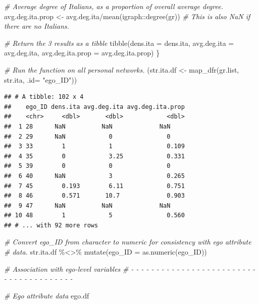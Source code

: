 \documentclass[
]{book}
\newenvironment{Shaded}{\begin{snugshade}}{\end{snugshade}}
\newcommand{\AttributeTok}[1]{\textcolor[rgb]{0.77,0.63,0.00}{#1}}
\newcommand{\CommentTok}[1]{\textcolor[rgb]{0.56,0.35,0.01}{\textit{#1}}}
\newcommand{\FunctionTok}[1]{\textcolor[rgb]{0.00,0.00,0.00}{#1}}
\newcommand{\NormalTok}[1]{#1}
\newcommand{\OtherTok}[1]{\textcolor[rgb]{0.56,0.35,0.01}{#1}}
\newcommand{\SpecialCharTok}[1]{\textcolor[rgb]{0.00,0.00,0.00}{#1}}
\newcommand{\StringTok}[1]{\textcolor[rgb]{0.31,0.60,0.02}{#1}}
\begin{document}
\begin{Shaded}
\begin{Highlighting}[]
  \CommentTok{\# Average degree of Italians, as a proportion of overall average degree.}
\NormalTok{  avg.deg.ita.prop }\OtherTok{\textless{}{-}}\NormalTok{ avg.deg.ita}\SpecialCharTok{/}\FunctionTok{mean}\NormalTok{(igraph}\SpecialCharTok{::}\FunctionTok{degree}\NormalTok{(gr))}
  \CommentTok{\# This is also NaN if there are no Italians. }
  
  \CommentTok{\# Return the 3 results as a tibble}
  \FunctionTok{tibble}\NormalTok{(}\AttributeTok{dens.ita =}\NormalTok{ dens.ita, }
         \AttributeTok{avg.deg.ita =}\NormalTok{ avg.deg.ita, }
         \AttributeTok{avg.deg.ita.prop =}\NormalTok{ avg.deg.ita.prop)}
\NormalTok{\}}

\CommentTok{\# Run the function on all personal networks.}
\NormalTok{(str.ita.df }\OtherTok{\textless{}{-}} \FunctionTok{map\_dfr}\NormalTok{(gr.list, str.ita, }\AttributeTok{.id=} \StringTok{"ego\_ID"}\NormalTok{))}
\end{Highlighting}
\end{Shaded}

\begin{verbatim}
## # A tibble: 102 x 4
##    ego_ID dens.ita avg.deg.ita avg.deg.ita.prop
##    <chr>     <dbl>       <dbl>            <dbl>
##  1 28      NaN          NaN             NaN    
##  2 29      NaN            0               0    
##  3 33        1            1               0.109
##  4 35        0            3.25            0.331
##  5 39        0            0               0    
##  6 40      NaN            3               0.265
##  7 45        0.193        6.11            0.751
##  8 46        0.571       10.7             0.903
##  9 47      NaN          NaN             NaN    
## 10 48        1            5               0.560
## # ... with 92 more rows
\end{verbatim}

\begin{Shaded}
\begin{Highlighting}[]
\CommentTok{\# Convert ego\_ID from character to numeric for consistency with ego attribute}
\CommentTok{\# data.}
\NormalTok{str.ita.df }\SpecialCharTok{\%\textless{}\textgreater{}\%}
  \FunctionTok{mutate}\NormalTok{(}\AttributeTok{ego\_ID =} \FunctionTok{as.numeric}\NormalTok{(ego\_ID))}

\CommentTok{\# Association with ego{-}level variables}
\CommentTok{\# {-} {-} {-} {-} {-} {-} {-} {-} {-} {-} {-} {-} {-} {-} {-} {-} {-} {-} {-} {-} {-} {-} {-} {-} {-} {-} {-} {-} {-} {-} {-} {-} {-} {-} {-} {-} {-} {-} {-} }

\CommentTok{\# Ego attribute data}
\NormalTok{ego.df}
\end{Highlighting}
\end{Shaded}
\end{document}
